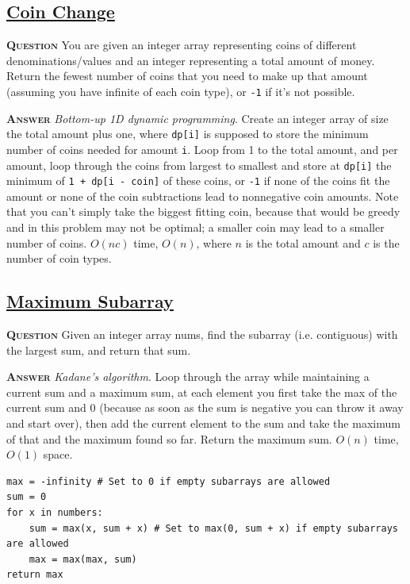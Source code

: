 \documentclass[table, xcdraw]{article}%
\begin{document}
\subsection{\href{https://leetcode.com/problems/coin-change}{Coin Change}}

\textsc{\textbf{Question}} You are given an integer array representing coins of different denominations/values and an integer representing a total amount of money. Return the fewest number of coins that you need to make up that amount (assuming you have infinite of each coin type), or \texttt{-1} if it's not possible.

\textsc{\textbf{Answer}} \textit{Bottom-up 1D dynamic programming}. Create an integer array of size the total amount plus one, where \texttt{dp[i]} is supposed to store the minimum number of coins needed for amount \texttt{i}. Loop from 1 to the total amount, and per amount, loop through the coins from largest to smallest and store at \texttt{dp[i]} the minimum of \texttt{1 + dp[i - coin]} of these coins, or \texttt{-1} if none of the coins fit the amount or none of the coin subtractions lead to nonnegative coin amounts. Note that you can't simply take the biggest fitting coin, because that would be greedy and in this problem may not be optimal; a smaller coin may lead to a smaller number of coins. $O(nc)$ time, $O(n)$, where $n$ is the total amount and $c$ is the number of coin types.

\subsection{\href{https://leetcode.com/problems/maximum-subarray}{Maximum Subarray}}

\textsc{\textbf{Question}} Given an integer array nums, find the subarray (i.e. contiguous) with the largest sum, and return that sum.

\textsc{\textbf{Answer}} \textit{Kadane's algorithm}. Loop through the array while maintaining a current sum and a maximum sum, at each element you first take the max of the current sum and $0$ (because as soon as the sum is negative you can throw it away and start over), then add the current element to the sum and take the maximum of that and the maximum found so far. Return the maximum sum. $O(n)$ time, $O(1)$ space.

\begin{verbatim}
max = -infinity # Set to 0 if empty subarrays are allowed
sum = 0
for x in numbers:
	sum = max(x, sum + x) # Set to max(0, sum + x) if empty subarrays are allowed
	max = max(max, sum)
return max
\end{verbatim}
\end{document}
